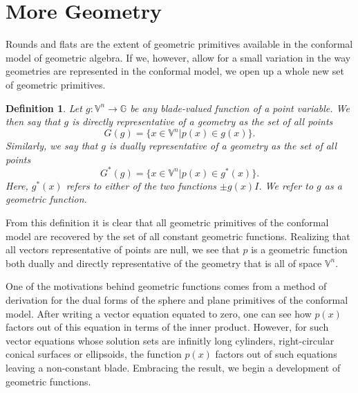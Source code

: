 \documentclass[12pt]{article}
\newcommand{\G}{\mathbb{G}}
\newcommand{\V}{\mathbb{V}}
\newtheorem{definition}{Definition}[section]
\begin{document}
\section{More Geometry}

Rounds and flats are the extent of geometric primitives available in the conformal
model of geometric algebra.  If we, however, allow for a small variation in the way
geometries are represented in the conformal model, we open up a whole new set
of geometric primitives.

\begin{definition}
Let $g:\V^n\to\G$ be any blade-valued function of a point variable.
We then say that $g$ is directly representative of a geometry as
the set of all points
\begin{equation*}
G(g)=\{x\in\V^n|p(x)\in g(x)\}.
\end{equation*}
Similarly, we say that $g$ is dually representative of a geometry as the set
of all points
\begin{equation*}
G^*(g) = \{x\in\V^n|p(x)\in g^*(x)\}.
\end{equation*}
Here, $g^*(x)$ refers to either of the two functions $\pm g(x)I$.
We refer to $g$ as a geometric function.
\end{definition}
From this definition it is clear that all geometric primitives of the conformal model
are recovered by the set of all constant geometric functions.  Realizing that
all vectors representative of points are null, we see that $p$ is a geometric
function both dually and directly representative of the geometry that is all
of space $\V^n$.

One of the motivations behind geometric functions comes from a method
of derivation for the dual forms of the sphere and plane primitives of
the conformal model.  After writing a vector equation equated to zero,
one can see how $p(x)$ factors out of this equation in terms of the inner product.
However, for such vector equations whose solution sets are infinitly long cylinders,
right-circular conical surfaces or ellipsoids, the function $p(x)$ factors out of such
equations leaving a non-constant blade.  Embracing the result, we begin a
development of geometric functions.
\end{document}
